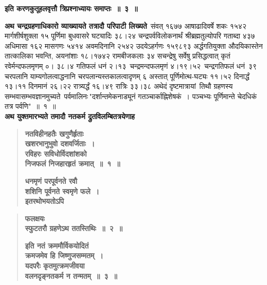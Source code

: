\documentclass[11pt, openany]{book}
\begin{document}
\begin{center}
{\large \textbf{इति करणकुतूहलवृत्तौ त्रिप्रश्नाध्यायः समाप्तः~॥~३~॥}}
\end{center}

\newpage

{\small \textbf{अथ चन्द्रग्रहणाधिकारो व्याख्यायते तत्रादौ परिपाटी लिख्यते\textendash}} \,संवत् १६७७ आषाढादिवर्षे शकः १५४२ मार्गशीर्षशुक्ला १५ पूर्णिमा बुधवासरे घट्यादिः ३८।२४ चन्द्रपर्वविलोकनार्थं श्रीब्रह्मतुल्योपरि गताब्दा ४३७ अधिमासा १६२ मासगणः ५४१४ अवमदिनानि २५४२ उदयेऽहर्गणः १५९८९३ अर्द्धगतियुक्ता औदयिकास्तेन तात्कालिका भवन्ति, अयनांशाः १८।१७४२ रामबीजकलाः ३४ सचन्द्रेषु सर्वेषु प्रसिद्धत्वात् कृतं रवेर्मन्दफलमृणम् ०। ३८।४ गतिफलं धनं \;२।१३ \,चन्द्रमन्दफलमृणं \;४।१९।५२ \,चन्द्रगतिफलं \;धनं \,३९ \;चरपलानि याम्यगोलत्वाद्धनानि \;चरपलान्यस्तकालत्वादृणम् \;६ \;अस्तात् \;पूर्णिमोत्थ-घट्यः ११।५२ दिनार्द्धं १३।११ दिनमानं २६।२२ रात्र्यर्द्धं १६।४९ रात्रिः ३३।३८ अथेदं \;दृष्टमात्रायां \,तिथौ \;ग्रहणस्य \;सम्भवासम्भवज्ञानमुच्यते \,{\color{violet}पर्वमालिनः\textendash \,"दर्शान्तमेकनाड्यूनं गतञ्चार्काह्निशेषकं~। पञ्चभ्यः पूर्णिमान्ते चेदधिकं तत्र पर्वणि"}~॥~१~॥\\

{\small \textbf{अथ युक्तमारभ्यते तमादौ नतकर्म द्रुतविलम्बितत्रयेणाह\textendash }}

 \label{4.1}
\begin{quote}
{\large \textbf{{\color{purple}नतविहीनहतैः खगुणैर्हृताः\\
खशरभानुभुवो दशवर्जिताः~। \\
रविहरः सविधोर्विदशांशको \\
निजफलं निजहारहृतं क्रमात्~॥~१~॥}}
\vspace{1mm}

 \label{4.2.1}
\textbf{{\color{purple}धनमृणं परपूर्वनते रवौ\\
शशिनि पूर्वनते स्वमृणे फले~। \\
इतरथोभयतोऽपि}}}
\end{quote}

\newpage

 \label{4.2}
\begin{quote}
{\large \textbf{{\color{purple}फलक्षयः \\
स्फुटतरौ ग्रहणेऽथ ततस्तिथिः~॥~२~॥}}
\vspace{1mm}

 \label{4.3}
\textbf{{\color{purple}इति नतं क्रममौर्विकयोदितं \\
क्रमजमेव हि जिष्णुजसम्मतम्~। \\
यदपरैः कृतमुत्क्रमजीवया \\
वलनदृङ्नतकर्म न तन्मतम्~॥~३~॥}}}
\end{quote}
\end{document}
